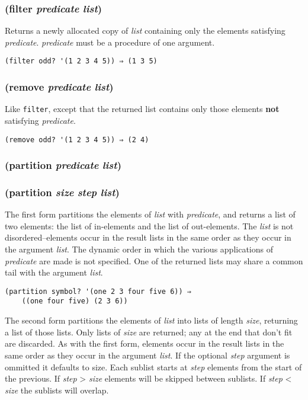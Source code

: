 \documentclass{article}
\begin{document}
\subsubsection{(filter \emph{predicate} \emph{list})}

Returns a newly allocated copy of \emph{list} containing only the elements satisfying
\emph{predicate}. \emph{predicate} must be a procedure of one argument.

\begin{verbatim}
(filter odd? '(1 2 3 4 5)) ⇒ (1 3 5)
\end{verbatim}

\subsubsection{(remove \emph{predicate} \emph{list})}

Like \verb|filter|, except that the returned list contains only those elements \textbf{not}
satisfying \emph{predicate}.

\begin{verbatim}
(remove odd? '(1 2 3 4 5)) ⇒ (2 4)
\end{verbatim}

\subsubsection{(partition \emph{predicate} \emph{list})}

\subsubsection{(partition \emph{size} \emph{step} \emph{list})}

The first form partitions the elements of \emph{list} with \emph{predicate}, and returns a
list of two elements: the list of in-elements and the list of out-elements. The \emph{list} is
not disordered--elements occur in the result lists in the same order as they occur in the
argument \emph{list}. The dynamic order in which the various applications of \emph{predicate}
are made is not specified. One of the returned lists may share a common tail with the argument
\emph{list}.

\begin{verbatim}
(partition symbol? '(one 2 3 four five 6)) ⇒
    ((one four five) (2 3 6))
\end{verbatim}

The second form partitions the elements of \emph{list} into lists of length \emph{size},
returning a list of those lists. Only lists of \emph{size} are returned; any at the end that
don't fit are discarded. As with the first form, elements occur in the result lists in the
same order as they occur in the argument \emph{list}. If the optional \emph{step} argument is
ommitted it defaults to size. Each sublist starts at \emph{step} elements from the start of
the previous. If \emph{step} \textgreater{} \emph{size} elements will be skipped between
sublists. If \emph{step} \textless{} \emph{size} the sublists will overlap.
\end{document}
